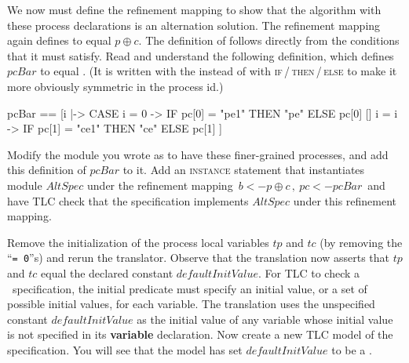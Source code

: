 \documentclass[fleqn,leqno]{article}
\begin{document}
We now must define the refinement mapping to show that the algorithm
with these process declarations is an alternation solution.  The
refinement mapping again defines  to equal $p\oplus c$.  The
definition of  follows directly from the conditions that it
must satisfy.  Read and understand the following definition, which
defines $pcBar$ to equal .  (It is written with the
 instead of with
\textsc{if}\,/\,\textsc{then}\,/\,\textsc{else} to make it more
obviously symmetric in the process id.)
\begin{display}
\begin{notla}
pcBar == [i  |-> CASE i = 0 -> IF pc[0] = "pe1" THEN "pe"
                                                          ELSE pc[0]
                             [] i = i -> IF pc[1] = "ce1" THEN "ce"
                                                          ELSE pc[1] ]
\end{notla}
\begin{tlatex}
 \@x{ pcBar \.{\defeq} [ i \.{\in} \{ 0 ,\, 1 \} \.{\mapsto} {\CASE} i \.{=} 0
 \.{\rightarrow} {\IF} pc [ 0 ] \.{=}\@w{pe1} \.{\THEN}\@w{pe}}%
%
\@x{\@s{242.04} \.{\ELSE} pc [ 1 ] ]}%
\end{tlatex}
\end{display}

\begin{question}
Modify the module you wrote as  to have these finer-grained
processes, and add this definition of $pcBar$ to it.  Add an
\textsc{instance} statement that instantiates module $AltSpec$ under
the refinement mapping
  \,$b <- p \oplus c\,, \ pc <- pcBar$\,
and have TLC check that the specification implements $AltSpec$ under
this refinement mapping.
\end{question}

Remove the initialization of the process local variables $tp$ and $tc$
(by removing the ``\texttt{= 0}''s) and rerun the translator.  Observe
that the translation now asserts that $tp$
and $tc$ equal the declared constant 
$defaultInitValue$.  For TLC to check a \tlaplus\ specification, the
initial predicate must specify an initial value, or a set of possible
initial values, for each variable.  The translation uses the
unspecified constant $defaultInitValue$ as the initial value of any
variable whose initial value is not specified in its \textbf{variable}
declaration.  
Now create a new TLC model of the specification.  You will see that
the model has set $defaultInitValue$ to be a
.
\end{document}
